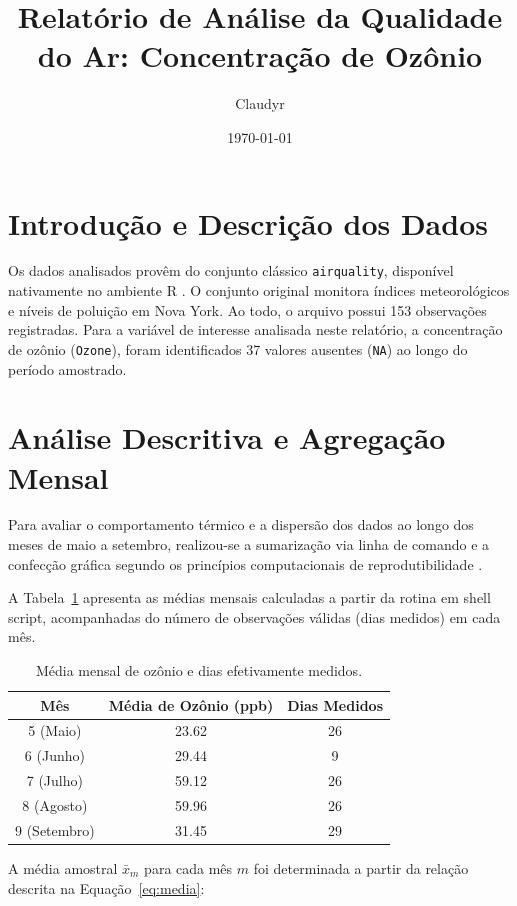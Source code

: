 \documentclass[12pt]{article}
\title{Relatório de Análise da Qualidade do Ar: Concentração de Ozônio}
\author{Claudyr}
\date{\today}
\begin{document}
\maketitle

\section{Introdução e Descrição dos Dados}

Os dados analisados provêm do conjunto clássico \texttt{airquality}, disponível nativamente no ambiente R \citep{rbase}. O conjunto original monitora índices meteorológicos e níveis de poluição em Nova York. Ao todo, o arquivo possui 153 observações registradas. Para a variável de interesse analisada neste relatório, a concentração de ozônio (\texttt{Ozone}), foram identificados 37 valores ausentes (\texttt{NA}) ao longo do período amostrado.

\section{Análise Descritiva e Agregação Mensal}

Para avaliar o comportamento térmico e a dispersão dos dados ao longo dos meses de maio a setembro, realizou-se a sumarização via linha de comando e a confecção gráfica segundo os princípios computacionais de reprodutibilidade \citep{chambers2016}.

A Tabela~\ref{tab:resumo} apresenta as médias mensais calculadas a partir da rotina em shell script, acompanhadas do número de observações válidas (dias medidos) em cada mês.

\begin{table}[htbp]
  \centering
  \caption{Média mensal de ozônio e dias efetivamente medidos.}
  \label{tab:resumo}
  \begin{tabular}{ccc}
    \toprule
    Mês & Média de Ozônio (ppb) & Dias Medidos \\
    \midrule
    5 (Maio) & 23.62 & 26 \\
    6 (Junho) & 29.44 & 9 \\
    7 (Julho) & 59.12 & 26 \\
    8 (Agosto) & 59.96 & 26 \\
    9 (Setembro) & 31.45 & 29 \\
    \bottomrule
  \end{tabular}
\end{table}

A média amostral $\bar{x}_m$ para cada mês $m$ foi determinada a partir da relação descrita na Equação~\eqref{eq:media}:
\end{document}
